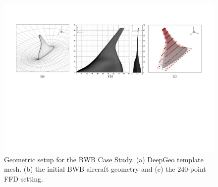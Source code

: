 \begin{figure}[ht]
    \begin{center}
        \includegraphics[width=1\linewidth]{chapter5/fig/bwb_template_mesh_initial_geometry.pdf}
    \end{center}
    \caption{
        \small Geometric setup for the BWB Case Study. (a) DeepGeo template mesh. (b) the initial BWB aircraft geometry and (c) the 240-point FFD setting.
    }
    \label{ch5:fig:cs3_template_mesh}
\end{figure}



